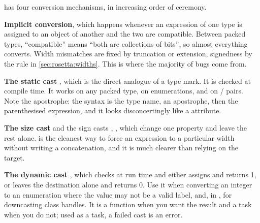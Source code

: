 
\SV{} has four conversion mechanisms, in increasing order of ceremony.

\textbf{Implicit conversion}, which happens whenever an expression of one type
is assigned to an object of another and the two are compatible. Between packed
types, ``compatible'' means ``both are collections of bits'', so almost everything
converts. Width mismatches are fixed by truncation or extension, signedness by
the rule in \cref{sec:rosetta:widths}. This is where the majority of \SV{} bugs
come from.

\textbf{The static cast} , which is the direct analogue of a
\VHDL{} type mark. It is checked at compile time. It works on any packed type,
on enumerations, and on / pairs. Note the apostrophe: the
syntax is the type name, an apostrophe, then the parenthesised expression, and
it looks disconcertingly like a \VHDL{} attribute.

\textbf{The size cast}  and the sign casts
, , which change one property and
leave the rest alone.  is the cleanest way to force an
expression to a particular width without writing a concatenation, and it is
much clearer than relying on the target.

\textbf{The dynamic cast} , which checks at run time and
either assigns and returns 1, or leaves the destination alone and returns 0.
Use it when converting an integer to an enumeration where the value may not be
a valid label, and, in , for downcasting class handles. It is a
function when you want the result and a task when you do not; used as a task,
a failed cast is an error.


